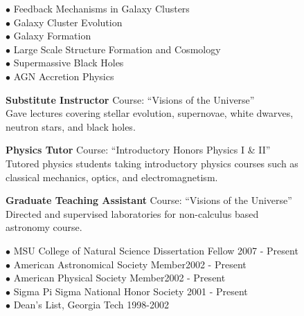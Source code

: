 \documentclass[12pt]{cv}
\begin{document}
\begin{llist}

$\bullet$ Feedback Mechanisms in Galaxy Clusters\\
$\bullet$ Galaxy Cluster Evolution\\
$\bullet$ Galaxy Formation\\
$\bullet$ Large Scale Structure Formation and Cosmology\\
$\bullet$ Supermassive Black Holes\\
$\bullet$ AGN Accretion Physics


{\sc \bf{Substitute Instructor}}
Course: ``Visions of the Universe''\\
Gave lectures covering stellar evolution, supernovae, white dwarves,\\
neutron stars, and black holes.

{\sc \bf{Physics Tutor}}
Course: ``Introductory Honors Physics I \& II''\\
Tutored physics students taking introductory physics courses such as\\
classical mechanics, optics, and electromagnetism.

{\sc \bf{Graduate Teaching Assistant}}
Course: ``Visions of the Universe''\\
Directed and supervised laboratories for non-calculus based\\
astronomy course.



$\bullet$ MSU College of Natural Science Dissertation Fellow \hfill 2007 - Present\\
$\bullet$ American Astronomical Society Member\hfill 2002 - Present\\
$\bullet$ American Physical Society Member\hfill 2002 - Present\\
$\bullet$ Sigma Pi Sigma National Honor Society \hfill 2001 - Present\\
$\bullet$ Dean's List, Georgia Tech \hfill 1998-2002


\end{llist}
\end{document}

